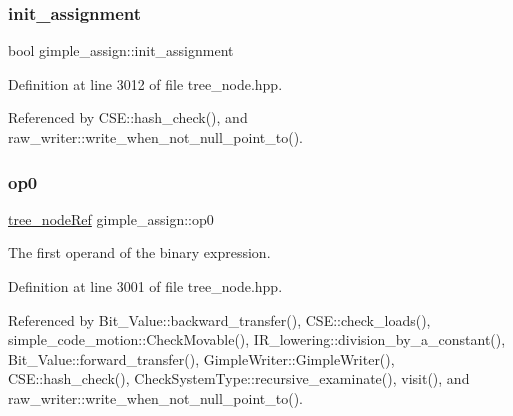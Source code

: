 \mbox{\label{structgimple__assign_a4590b7cabbdd727cdcb2136b21e65789}} 
\subsubsection{\texorpdfstring{init\+\_\+assignment}{init\_assignment}}
{\footnotesize\ttfamily bool gimple\+\_\+assign\+::init\+\_\+assignment}



Definition at line 3012 of file tree\+\_\+node.\+hpp.



Referenced by C\+S\+E\+::hash\+\_\+check(), and raw\+\_\+writer\+::write\+\_\+when\+\_\+not\+\_\+null\+\_\+point\+\_\+to().

\mbox{\label{structgimple__assign_a44a5273993b6c90e7f1cb32b5450fed8}} 
\subsubsection{\texorpdfstring{op0}{op0}}
{\footnotesize\ttfamily \hyperlink{tree__node_8hpp_a6ee377554d1c4871ad66a337eaa67fd5}{tree\+\_\+node\+Ref} gimple\+\_\+assign\+::op0}



The first operand of the binary expression. 



Definition at line 3001 of file tree\+\_\+node.\+hpp.



Referenced by Bit\+\_\+\+Value\+::backward\+\_\+transfer(), C\+S\+E\+::check\+\_\+loads(), simple\+\_\+code\+\_\+motion\+::\+Check\+Movable(), I\+R\+\_\+lowering\+::division\+\_\+by\+\_\+a\+\_\+constant(), Bit\+\_\+\+Value\+::forward\+\_\+transfer(), Gimple\+Writer\+::\+Gimple\+Writer(), C\+S\+E\+::hash\+\_\+check(), Check\+System\+Type\+::recursive\+\_\+examinate(), visit(), and raw\+\_\+writer\+::write\+\_\+when\+\_\+not\+\_\+null\+\_\+point\+\_\+to().

\mbox{\label{structgimple__assign_a989a63b4d607c1c6d2543089c17f9e93}} 
